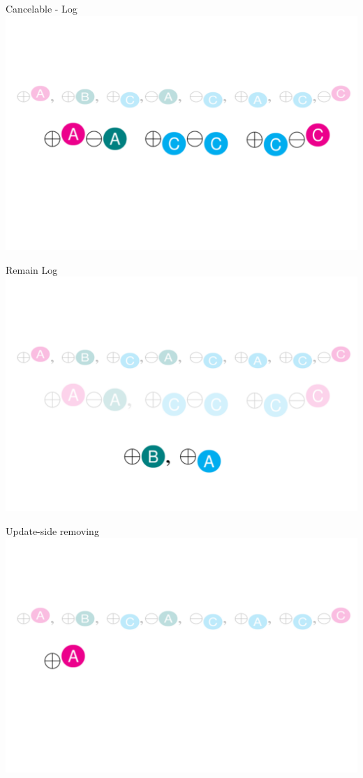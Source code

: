 \documentclass[english]{beamer} %
\begin{document}
\begin{frame}{Cancelable - Log}
\includegraphics[scale=0.5]{fig/example_2}
\end{frame}


\begin{frame}{Remain Log}
\includegraphics[scale=0.5]{fig/example_3}
\end{frame}


\begin{frame}{Update-side removing}
\includegraphics[scale=0.5]{fig/update_remove_0}
\end{frame}
\end{document}
